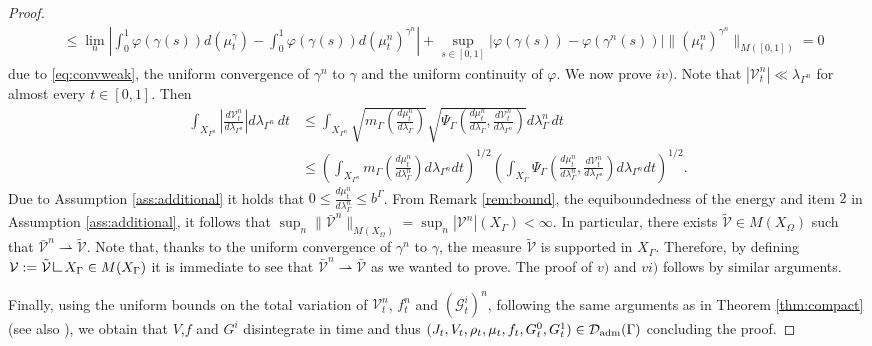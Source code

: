 \documentclass{article}
\newcommand{\res}{\mathop{\hbox{\vrule height 7pt width .5pt depth 0pt
\vrule height .5pt width 6pt depth 0pt}}\nolimits}
\begin{document}
\begin{proof}
\begin{align*}
        & \leq   \lim_n\left| \int_0^1 \varphi(\gamma(s)) d(\mu^{\gamma}_t) - \int_0^1 \varphi(\gamma(s)) d(\mu_t^n)^{\gamma^n}\right| + \sup_{s \in [0,1]}  |\varphi(\gamma(s)) - \varphi(\gamma^n(s))| \|(\mu_t^n)^{\gamma^n}\|_{M([0,1])} = 0
    \end{align*}
   due to \eqref{eq:convweak}, the uniform convergence of $\gamma^n$ to $\gamma$ and the uniform continuity of $\varphi$.  
We now prove $iv)$.  Note that $|\mathcal{V}_t^n| \ll \lambda_{\Gamma^n}$ for almost every $t \in [0,1]$. Then 
    \begin{align}
        \int_{X_{\Gamma^n}} \left|\frac{d\mathcal{V}^n_t}{d\lambda_{\Gamma^n}}\right| d \lambda_{\Gamma^n}\, dt &\leq \int_{X_{\Gamma^n}}  \sqrt{m_{\Gamma}\left(\frac{d\mu^n_t}{d\lambda_\Gamma}\right)}\sqrt{\Psi_{\Gamma}\left(\frac{d\mu^n_t}{d\lambda_\Gamma},\frac{d\mathcal{V}^n_t}{d\lambda_{\Gamma^n}}\right) }d\lambda_\Gamma^n\, dt \\
        & \leq \left(\int_{X_{\Gamma^n}}  m_{\Gamma}\left(\frac{d\mu^n_t}{d\lambda_\Gamma^n}\right) d\lambda_{\Gamma^n} dt\right)^{1/2}
       \left(\int_{X_\Gamma}   \Psi_{\Gamma}\left(\frac{d\mu^n_t}{d\lambda_\Gamma^n},\frac{d\mathcal{V}^n_t}{d\lambda_{\Gamma^n}}\right) d\lambda_{\Gamma^n} dt\right)^{1/2}.
    \end{align}
 Due to Assumption \ref{ass:additional} it holds that $0\leq \frac{d\mu^n_t}{d\lambda_\Gamma^n} \leq b^{\Gamma}$. From Remark \ref{rem:bound}, the equiboundedness of the energy and item $2$ in Assumption \ref{ass:additional}, it follows that $\sup_n\|\bar{\mathcal{V}}^n\|_{M(X_\Omega)} = \sup_n |\mathcal{V}^n|(X_{\Gamma}) <\infty$. In particular, there exists $\tilde{\mathcal{V}} \in M(X_\Omega)$ such that $\bar{\mathcal{V}}^n \rightharpoonup \tilde{\mathcal{V}}$. Note that, thanks to the uniform convergence of $\gamma^n$ to $\gamma$, the measure $\tilde{\mathcal{V}}$ is supported in $X_\Gamma$. Therefore, by defining $\mathcal{V} := \tilde{\mathcal{V}} \res X_\Gamma \in M(X_\Gamma)$ it is immediate to see that $\bar{\mathcal{V}}^n   \rightharpoonup \bar{\mathcal{V}}$ as we wanted to prove. The proof of $v)$ and $vi)$ follows by similar arguments.

 Finally, using the uniform bounds on the total variation of $\mathcal{V}_t^n$, $f_t^n$ and $(\mathcal{G}_t^i)^n$, following the same arguments as in Theorem \ref{thm:compact} (see also \cite[Lemma 4.5]{Dolbeault_2008}), we obtain that  
 $V$,$f$ and $G^i$ disintegrate in time and thus $(J_t,V_t,\rho_t,\mu_t,f_t, G_t^0,G_t^1) \in \mathcal{D}_{\rm adm}(\Gamma)$ concluding the proof.
   \end{proof}
\end{document}
